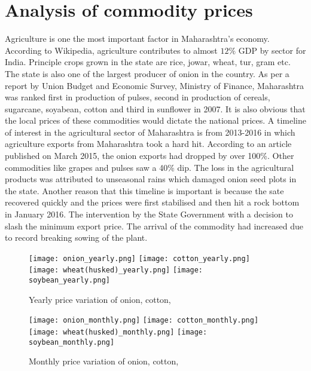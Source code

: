 \documentclass{article}
\begin{document}
\section{Analysis of commodity prices}
Agriculture is one the most important factor in Maharashtra's economy. According to Wikipedia, agriculture contributes to almost $ 12\% $ GDP by sector for India. Principle crops grown in the state are rice, jowar, wheat, tur, gram etc. The state is also one of the largest producer of onion in the country. As per a report by Union Budget and Economic Survey, Ministry of Finance, Maharashtra was ranked first in production of pulses, second in production of cereals, sugarcane, soyabean, cotton and third in sunflower in 2007. It is also obvious that the local prices of these commodities would dictate the national prices. A timeline of interest in the agricultural sector of Maharashtra is from 2013-2016 in which agriculture exports from Maharashtra took a hard hit. According to an article published on March 2015, the onion exports had dropped by over 100\%.  Other commodities like grapes and pulses saw a 40\% dip. The loss in the agricultural products was attributed to unseasonal rains which damaged onion seed plots in the state. Another reason that this timeline is important is because the sate recovered quickly and the prices were first stabilised and then hit a rock bottom in January 2016. The intervention by the State Government with a decision to slash the minimum export price. The arrival of the commodity had increased due to record breaking sowing of the plant. \par
\begin{figure*} 
	\texttt{[image: onion\_yearly.png]}
	\texttt{[image: cotton\_yearly.png]}\\
	\texttt{[image: wheat(husked)\_yearly.png]}
	\texttt{[image: soybean\_yearly.png]}
	\caption{Yearly price variation of onion, cotton,}
	\label{fig:Yearly}
\end{figure*}
\begin{figure*}
	\texttt{[image: onion\_monthly.png]}
	\texttt{[image: cotton\_monthly.png]}\\
	\texttt{[image: wheat(husked)\_monthly.png]}
	\texttt{[image: soybean\_monthly.png]}
	\caption{Monthly price variation of onion, cotton,}
	\label{fig:month}
\end{figure*}
\end{document}
